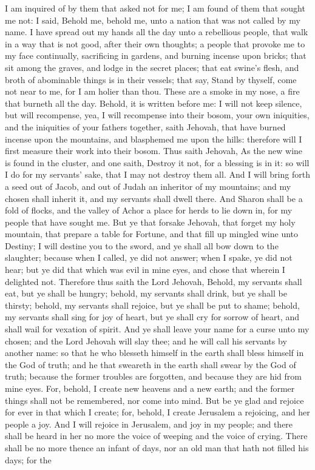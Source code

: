 I am inquired of by them that asked not for me; I am found of them that sought me not: I said, Behold me, behold me, unto a nation that was not called by my name. I have spread out my hands all the day unto a rebellious people, that walk in a way that is not good, after their own thoughts; a people that provoke me to my face continually, sacrificing in gardens, and burning incense upon bricks; that sit among the graves, and lodge in the secret places; that eat swine’s flesh, and broth of abominable things is in their vessels; that say, Stand by thyself, come not near to me, for I am holier than thou. These are a smoke in my nose, a fire that burneth all the day. Behold, it is written before me: I will not keep silence, but will recompense, yea, I will recompense into their bosom, your own iniquities, and the iniquities of your fathers together, saith Jehovah, that have burned incense upon the mountains, and blasphemed me upon the hills: therefore will I first measure their work into their bosom.  Thus saith Jehovah, As the new wine is found in the cluster, and one saith, Destroy it not, for a blessing is in it: so will I do for my servants’ sake, that I may not destroy them all. And I will bring forth a seed out of Jacob, and out of Judah an inheritor of my mountains; and my chosen shall inherit it, and my servants shall dwell there. And Sharon shall be a fold of flocks, and the valley of Achor a place for herds to lie down in, for my people that have sought me. But ye that forsake Jehovah, that forget my holy mountain, that prepare a table for Fortune, and that fill up mingled wine unto Destiny; I will destine you to the sword, and ye shall all bow down to the slaughter; because when I called, ye did not answer; when I spake, ye did not hear; but ye did that which was evil in mine eyes, and chose that wherein I delighted not.  Therefore thus saith the Lord Jehovah, Behold, my servants shall eat, but ye shall be hungry; behold, my servants shall drink, but ye shall be thirsty; behold, my servants shall rejoice, but ye shall be put to shame; behold, my servants shall sing for joy of heart, but ye shall cry for sorrow of heart, and shall wail for vexation of spirit. And ye shall leave your name for a curse unto my chosen; and the Lord Jehovah will slay thee; and he will call his servants by another name: so that he who blesseth himself in the earth shall bless himself in the God of truth; and he that sweareth in the earth shall swear by the God of truth; because the former troubles are forgotten, and because they are hid from mine eyes.  For, behold, I create new heavens and a new earth; and the former things shall not be remembered, nor come into mind. But be ye glad and rejoice for ever in that which I create; for, behold, I create Jerusalem a rejoicing, and her people a joy. And I will rejoice in Jerusalem, and joy in my people; and there shall be heard in her no more the voice of weeping and the voice of crying. There shall be no more thence an infant of days, nor an old man that hath not filled his days; for the 